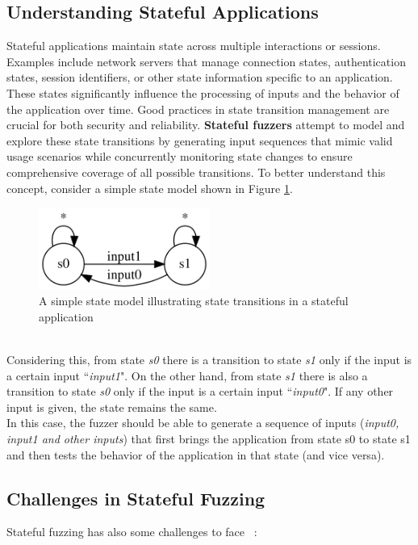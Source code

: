 \subsection{Understanding Stateful Applications}
Stateful applications maintain state across multiple interactions or sessions. Examples include network servers that manage connection states, authentication states, session identifiers, or other state information specific to an application. These states significantly influence the processing of inputs and the behavior of the application over time. Good practices in state transition management are crucial for both security and reliability. 
\textbf{Stateful fuzzers} attempt to model and explore these state transitions by generating input sequences that mimic valid usage scenarios while concurrently monitoring state changes to ensure comprehensive coverage of all possible transitions. To better understand this concept, consider a simple state model shown in Figure \ref{fig:simplestatemodel}.
\begin{figure}[H]
    \centering
    \includegraphics[width=0.5\textwidth]{Images/simplestatemodel.png}
    \caption{A simple state model illustrating state transitions in a stateful application}
    \label{fig:simplestatemodel}
\end{figure}
\phantom{}\\
Considering this, from state \textit{s0} there is a transition to state \textit{s1} only if the input is a certain input ``\textit{input1}". On the other hand, from state \textit{s1} there is also a transition to state \textit{s0} only if the input is a certain input ``\textit{input0}". If any other input is given, the state remains the same.
\\In this case, the fuzzer should be able to generate a sequence of inputs (\textit{input0, input1 and other inputs}) that first brings the application from state s0 to state s1 and then tests the behavior of the application in that state (and vice versa).

\subsection{Challenges in Stateful Fuzzing}
Stateful fuzzing has also some challenges to face ~\cite{statefulfuzzingchallenges}:

